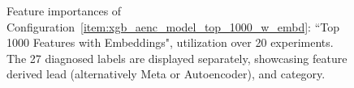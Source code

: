 \documentclass[\main/thesis.tex]{subfiles}
\begin{document}
\begin{appendices}
\begin{figure}[t]
    \centering
    \caption{Feature importances of Configuration~\ref{item:xgb_aenc_model_top_1000_w_embd}: ``Top 1000 Features with Embeddings", utilization over 20 experiments. The 27 diagnosed labels are displayed separately, showcasing feature derived lead (alternatively Meta or Autoencoder), and category.}
    \label{fig:xgb_aenc_top_1000_features_labelwise}
\end{figure}


\end{appendices}
\end{document}

